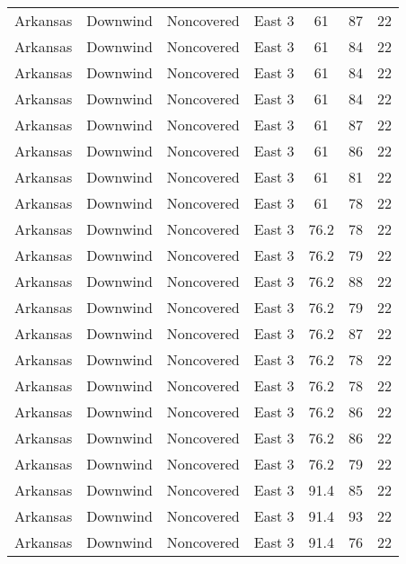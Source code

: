 \documentclass{article}
\begin{document}
\begin{longtable}[H]{ccccccc}
Arkansas & Downwind  & Noncovered & East 3        & 61           & 87          & 22  \\
Arkansas & Downwind  & Noncovered & East 3        & 61           & 84          & 22  \\
Arkansas & Downwind  & Noncovered & East 3        & 61           & 84          & 22  \\
Arkansas & Downwind  & Noncovered & East 3        & 61           & 84          & 22  \\
Arkansas & Downwind  & Noncovered & East 3        & 61           & 87          & 22  \\
Arkansas & Downwind  & Noncovered & East 3        & 61           & 86          & 22  \\
Arkansas & Downwind  & Noncovered & East 3        & 61           & 81          & 22  \\
Arkansas & Downwind  & Noncovered & East 3        & 61           & 78          & 22  \\
Arkansas & Downwind  & Noncovered & East 3        & 76.2         & 78          & 22  \\
Arkansas & Downwind  & Noncovered & East 3        & 76.2         & 79          & 22  \\
Arkansas & Downwind  & Noncovered & East 3        & 76.2         & 88          & 22  \\
Arkansas & Downwind  & Noncovered & East 3        & 76.2         & 79          & 22  \\
Arkansas & Downwind  & Noncovered & East 3        & 76.2         & 87          & 22  \\
Arkansas & Downwind  & Noncovered & East 3        & 76.2         & 78          & 22  \\
Arkansas & Downwind  & Noncovered & East 3        & 76.2         & 78          & 22  \\
Arkansas & Downwind  & Noncovered & East 3        & 76.2         & 86          & 22  \\
Arkansas & Downwind  & Noncovered & East 3        & 76.2         & 86          & 22  \\
Arkansas & Downwind  & Noncovered & East 3        & 76.2         & 79          & 22  \\
Arkansas & Downwind  & Noncovered & East 3        & 91.4         & 85          & 22  \\
Arkansas & Downwind  & Noncovered & East 3        & 91.4         & 93          & 22  \\
Arkansas & Downwind  & Noncovered & East 3        & 91.4         & 76          & 22  \\

\end{longtable}
\end{document}
